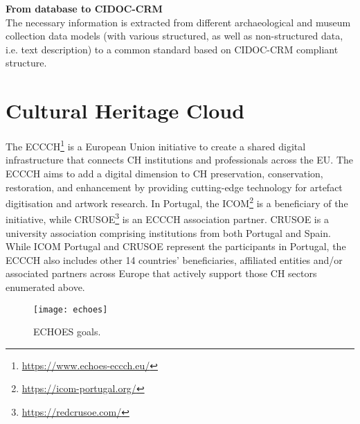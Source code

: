 \noindent \textbf{From database to \gls{CIDOC-CRM}} \\
The necessary information is extracted from different archaeological and museum collection data models (with various structured, as well as non-structured
data, i.e. text description) to a common standard based on \gls{CIDOC-CRM} compliant structure.
~\cite{eide2008encoding}




\section{Cultural Heritage Cloud}
\label{sec:ch_cloud}

The \gls{ECCCH}\footnote{\url{https://www.echoes-eccch.eu/}} is a European Union initiative 
to create a shared digital infrastructure that connects \gls{CH} institutions and professionals across the \gls{EU}.
The \gls{ECCCH} aims to add a digital dimension to \gls{CH} preservation, conservation, restoration, and enhancement 
by providing cutting-edge technology for artefact digitisation and artwork research. 
In Portugal, the \gls{ICOM}\footnote{\url{https://icom-portugal.org/}} is a beneficiary of the initiative, while \gls{CRUSOE}\footnote{\url{https://redcrusoe.com/}} is an \gls{ECCCH} association partner. \gls{CRUSOE} is a university association comprising institutions from both Portugal and Spain.
While \gls{ICOM} Portugal and \gls{CRUSOE} represent the participants in Portugal, the \gls{ECCCH} also includes other 14 countries' beneficiaries, affiliated entities and/or associated partners across Europe that actively support those \gls{CH} sectors enumerated above.~\cite{ecchoes}


\begin{figure}[h!]
    \centering
    \texttt{[image: echoes]}
    \caption{\gls{ECHOES} goals. ~\cite{ecchoes}} 
    \label{fig:echoes}
\end{figure}
\FloatBarrier


